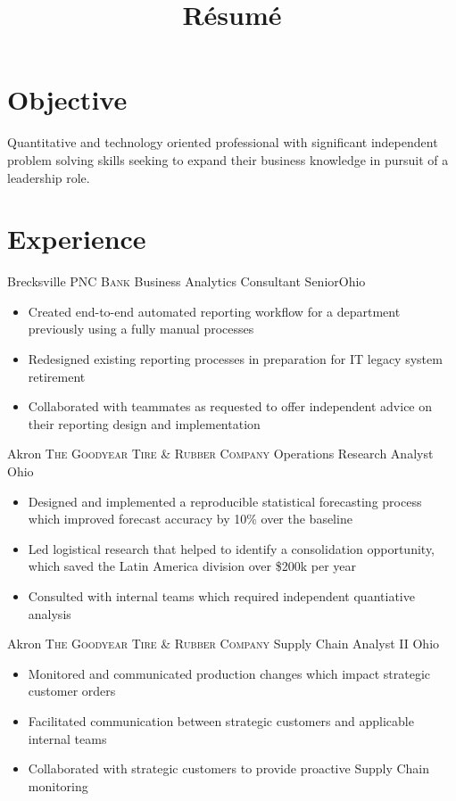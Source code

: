 \documentclass[letterpaper,12pt,color,final]{moderncv}
\title{Résumé} %
\begin{document}
\makecvtitle

\section{Objective}

Quantitative and technology oriented professional with significant independent problem solving skills seeking to expand their business knowledge in pursuit of a leadership role.

\section{Experience}

{Brecksville}
{\textsc{PNC Bank}}
{Business Analytics Consultant Senior}{Ohio}
{\begin{itemize}
  \item Created end-to-end automated reporting workflow for a department previously using a fully manual processes
  \item Redesigned existing reporting processes in preparation for IT legacy system retirement
  \item Collaborated with teammates as requested to offer independent advice on their reporting design and implementation
 \end{itemize}}

{Akron}
{\textsc{The Goodyear Tire \& Rubber Company}}
{Operations Research Analyst}
{Ohio}
{\begin{itemize}
  \item Designed and implemented a reproducible statistical forecasting process which improved forecast accuracy by 10\% over the baseline
  \item Led logistical research that helped to identify a consolidation opportunity, which saved the Latin America division over \$200k per year
  \item Consulted with internal teams which required independent quantiative analysis
 \end{itemize}}

{Akron}
{\textsc{The Goodyear Tire \& Rubber Company}}
{Supply Chain Analyst II}
{Ohio}
{\begin{itemize}
  \item Monitored and communicated production changes which impact strategic customer orders
  \item Facilitated communication between strategic customers and applicable internal teams
  \item Collaborated with strategic customers to provide proactive Supply Chain monitoring
 \end{itemize}}
\end{document}
